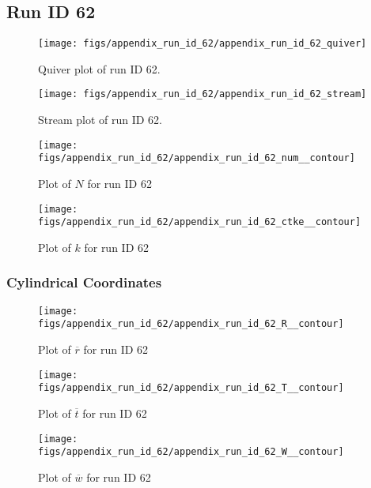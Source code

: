 \subsection{Run ID 62}
\begin{figure}[H]
\centering
\texttt{[image: figs/appendix\_run\_id\_62/appendix\_run\_id\_62\_quiver]}
\caption{Quiver plot of run ID 62.}
\label{fig:appendix_run_id_62_quiver}
\end{figure}


\begin{figure}[H]
\centering
\texttt{[image: figs/appendix\_run\_id\_62/appendix\_run\_id\_62\_stream]}
\caption{Stream plot of run ID 62.}
\label{fig:appendix_run_id_62_stream}
\end{figure}


\begin{figure}[H]
\centering
\texttt{[image: figs/appendix\_run\_id\_62/appendix\_run\_id\_62\_num\_\_contour]}
\caption{Plot of $N$ for run ID 62}
\label{fig:appendix_run_id_62_num__contour}
\end{figure}


\begin{figure}[H]
\centering
\texttt{[image: figs/appendix\_run\_id\_62/appendix\_run\_id\_62\_ctke\_\_contour]}
\caption{Plot of $k$ for run ID 62}
\label{fig:appendix_run_id_62_ctke__contour}
\end{figure}


\subsubsection{Cylindrical Coordinates}
\begin{figure}[H]
\centering
\texttt{[image: figs/appendix\_run\_id\_62/appendix\_run\_id\_62\_R\_\_contour]}
\caption{Plot of $\overline{r}$ for run ID 62}
\label{fig:appendix_run_id_62_R__contour}
\end{figure}


\begin{figure}[H]
\centering
\texttt{[image: figs/appendix\_run\_id\_62/appendix\_run\_id\_62\_T\_\_contour]}
\caption{Plot of $\overline{t}$ for run ID 62}
\label{fig:appendix_run_id_62_T__contour}
\end{figure}


\begin{figure}[H]
\centering
\texttt{[image: figs/appendix\_run\_id\_62/appendix\_run\_id\_62\_W\_\_contour]}
\caption{Plot of $\overline{w}$ for run ID 62}
\label{fig:appendix_run_id_62_W__contour}
\end{figure}



